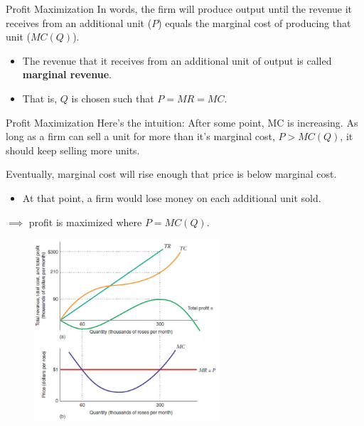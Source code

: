 \documentclass[11pt,t]{beamer}
\begin{document}
\begin{frame}{Profit Maximization}
  In words, the firm will produce output until the revenue it receives from an additional unit ($P$) equals the marginal cost of producing that unit ($MC(Q)$).

  \begin{itemize}
    \item The revenue that it receives from an additional unit of output is called \textbf{marginal revenue}.
    
    \item That is, $Q$ is chosen such that $P = MR = MC$.
  \end{itemize}
\end{frame}

\begin{frame}{Profit Maximization}
  Here's the intuition: After some point, MC is increasing. As long as a firm can sell a unit for more than it's marginal cost, $P > MC(Q)$, it should keep selling more units.

  \bigskip\pause
  Eventually, marginal cost will rise enough that price is below marginal cost.

  \begin{itemize}
    \item At that point, a firm would lose money on each additional unit sold.
  \end{itemize}

  \bigskip \pause
  $\implies$ profit is maximized where $P = MC(Q)$.
\end{frame}

\begin{frame}
  \begin{figure}
    \includegraphics[width=260px]{figures/fig9_1.jpg}
  \end{figure}
\end{frame}
\end{document}
